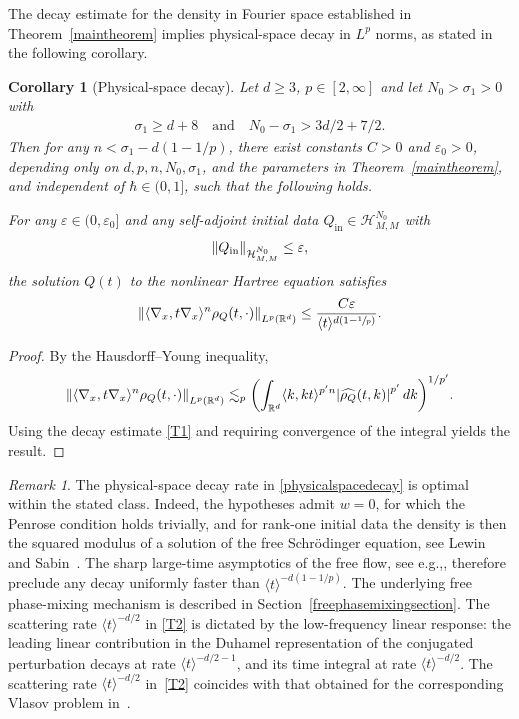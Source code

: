 \documentclass[11pt]{article}
\newcommand{\eg}{e.g.,\xspace}
\theoremstyle{plain}
\newtheorem{corollary}[theorem]{Corollary}
\theoremstyle{remark}
\newtheorem{remark}[theorem]{Remark}
\newcommand{\bbbr}[1]{\biggl(#1 \biggr)}
\newcommand{\jb}[1]{\langle#1\rangle}
\newcommand{\qaq}{\quad\text{and}\quad}
\newcommand{\ep}{\varepsilon}
\newcommand{\R}{\mathbb{R}}
\newcommand{\Qin}{Q_{\mathrm{in}}}
\begin{document}
The decay estimate for the density in Fourier space established in Theorem~\ref{maintheorem} implies physical-space decay in $L^p$ norms, as stated in the following corollary.
\begin{corollary}[Physical-space decay]
Let $d\geq 3$, $p\in[2,\infty]$ and let $N_0>\sigma_1>0$ with
\begin{align*}
\sigma_1\geq d+8\qaq N_0-\sigma_1>3d/2+7/2.
\end{align*}
Then for any $n<\sigma_1-d(1-1/p)$, there exist constants $C>0$ and $\ep_0>0$, depending only on $d,p,n,N_0,\sigma_1$, and the parameters in Theorem~\ref{maintheorem}, and independent of $\hbar\in(0,1]$, such that the following holds.

For any $\ep\in(0,\ep_0]$ and any self-adjoint initial data $\Qin\in\mathcal{H}^{N_0}_{M,M}$ with
\begin{align*}
\norm{Q_{\mathrm{in}}}_{\mathcal H^{N_0}_{M,M}}\leq\ep,
\end{align*}
the solution $Q(t)$ to the nonlinear Hartree equation satisfies
\begin{align}\label{physicalspacedecay}
\norm{\jb{\nabla_x,t\nabla_x}^n\rho_Q(t,\cdot)}_{L^p(\R^d)}\leq \frac{C\ep}{\jb{ t}^{d(1-\sfrac{1}{p})}}.
\end{align}
\end{corollary}
\begin{proof}
By the Hausdorff--Young inequality,
\begin{align*}
\norm{\jb{\nabla_x,t\nabla_x}^n\rho_Q(t,\cdot)}_{L^p(\R^d)}
\lesssim_p \bbbr{\int_{\R^d} \jb{k,kt}^{p'n} \abs{\widehat{\rho_Q}(t,k)}^{p'} \,dk}^{1/p'}.
\end{align*}
Using the decay estimate \eqref{T1} and requiring convergence of the integral yields the result.
\end{proof}

\begin{remark}\label{optimalityremark}
The physical-space decay rate in \eqref{physicalspacedecay} is optimal within the stated class. Indeed, the hypotheses admit $w=0$, for which the Penrose condition holds trivially, and for rank-one initial data the density is then the squared modulus of a solution of the free Schrödinger equation, see Lewin and Sabin~\cite{LewinSabinI2015}. The sharp large-time asymptotics of the free flow, see \eg \cite[Ch.\,2]{Cazenave2003}, therefore preclude any decay uniformly faster than $\jb{t}^{-d(1-1/p)}$. The underlying free phase-mixing mechanism is described in Section~\ref{freephasemixingsection}. The scattering rate $\jb{t}^{-d/2}$ in \eqref{T2} is dictated by the low-frequency linear response: the leading linear contribution in the Duhamel representation of the conjugated perturbation decays at rate $\jb{t}^{-d/2-1}$, and its time integral at rate $\jb{t}^{-d/2}$. The scattering rate $\jb{t}^{-d/2}$ in~\eqref{T2} coincides with that obtained for the corresponding Vlasov problem in~\cite{BedrossianMasmoudiMouhot2018}.
\end{remark}
\end{document}
